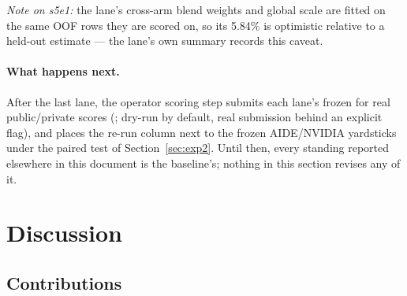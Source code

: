 \documentclass[11pt,a4paper]{article}
\begin{document}
\noindent\emph{Note on s5e1:} the lane's cross-arm blend weights and global scale are fitted on the same OOF rows they are scored on, so its 5.84\% is optimistic relative to a held-out estimate --- the lane's own summary records this caveat.

\paragraph{What happens next.} After the last lane, the operator scoring step submits each lane's frozen  for real public/private scores (; dry-run by default, real submission behind an explicit flag), and  places the re-run column next to the frozen AIDE/NVIDIA yardsticks under the paired test of Section~\ref{sec:exp2}. Until then, every standing reported elsewhere in this document is the baseline's; nothing in this section revises any of it.

\section{Discussion}

\subsection{Contributions}
\end{document}
